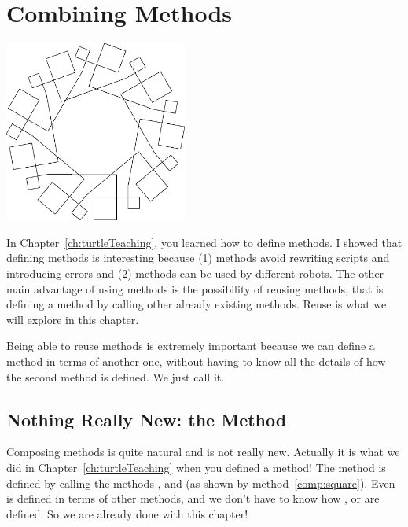 \ifx\wholebook\relax\else



\fi

\chapter{Combining Methods}\label{ch:composons}

\begin{chapterfigure}
\includegraphics[width=6cm]{compArtNouveauTurningScr}
\end{chapterfigure}

In  Chapter~\ref{ch:turtleTeaching}, you learned how to define methods. I showed that defining methods is interesting because (1) methods avoid rewriting scripts and introducing errors and (2) methods can be used by different robots. The other main advantage of using methods  is the possibility of reusing methods, that is defining a method by calling other already existing methods. Reuse is what we will explore in this chapter.

Being able to reuse methods is extremely important because we can define a method in terms of another one, without having to know all the details of how the second method is defined.  We just call it.

\section{Nothing Really New: the  Method}
Composing methods is quite natural and is not really new. Actually it is what we did in Chapter~\ref{ch:turtleTeaching} when you defined a method! The method  is defined by calling the methods \turnLeft,  and \timesRepeat (as shown by method~\ref{comp:square}). Even  is defined in terms of other methods, and we don't have to know how \turnLeft,  or \timesRepeat are defined. So we are already done with this chapter!

